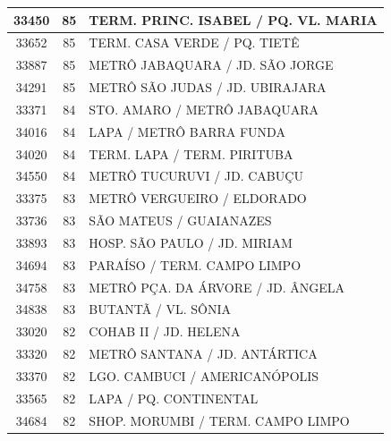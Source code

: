 \documentclass[
	12pt,				%
	oneside,			%
	a4paper,			%
	english,			%
	brazil				%
	]{abntex2ppgsi}
\begin{document}
\begin{apendicesenv}
\begin{longtable}{c|c|p{7cm}}
    33450 & 85    & TERM. PRINC. ISABEL / PQ. VL. MARIA \\
\hline

    33652 & 85    & TERM. CASA VERDE / PQ. TIETÊ \\
\hline

    33887 & 85    & METRÔ JABAQUARA / JD. SÃO JORGE \\
\hline

    34291 & 85    & METRÔ SÃO JUDAS / JD. UBIRAJARA \\
\hline

    33371 & 84    & STO. AMARO / METRÔ JABAQUARA \\
\hline

    34016 & 84    & LAPA / METRÔ BARRA FUNDA \\
\hline

    34020 & 84    & TERM. LAPA / TERM. PIRITUBA \\
\hline

    34550 & 84    & METRÔ TUCURUVI / JD. CABUÇU \\
\hline

    33375 & 83    & METRÔ VERGUEIRO / ELDORADO \\
\hline

    33736 & 83    & SÃO MATEUS / GUAIANAZES \\
\hline

    33893 & 83    & HOSP. SÃO PAULO / JD. MIRIAM \\
\hline

    34694 & 83    & PARAÍSO / TERM. CAMPO LIMPO \\
\hline

    34758 & 83    & METRÔ PÇA. DA ÁRVORE / JD. ÂNGELA \\
\hline

    34838 & 83    & BUTANTÃ / VL. SÔNIA \\
\hline

    33020 & 82    & COHAB II / JD. HELENA \\
\hline

    33320 & 82    & METRÔ SANTANA / JD. ANTÁRTICA \\
\hline

    33370 & 82    & LGO. CAMBUCI / AMERICANÓPOLIS \\
\hline

    33565 & 82    & LAPA / PQ. CONTINENTAL \\
\hline

    34684 & 82    & SHOP. MORUMBI / TERM. CAMPO LIMPO \\
\hline


\end{longtable}
\end{apendicesenv}
\end{document}
